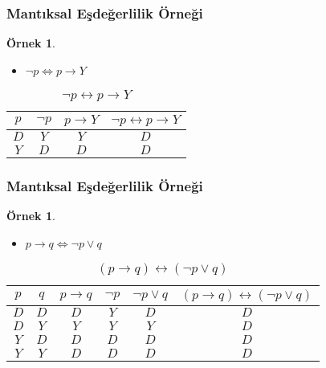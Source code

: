\documentclass[dvipsnames]{beamer}
\theoremstyle{definition}
\theoremstyle{example}
\newtheorem{ornek}[theorem]{Örnek}
\theoremstyle{plain}
\begin{document}
\begin{frame}
  \frametitle{Mantıksal Eşdeğerlilik Örneği}

  \begin{ornek}
    \begin{itemize}
      \item $\neg p \Leftrightarrow p \rightarrow Y$
    \end{itemize}

    \begin{table}
      \caption{$\neg p \leftrightarrow p \rightarrow Y$}
      \begin{tabular}{|c|c|c||c|}\hline
        $p$ & $\neg p$ & $p \rightarrow Y$
            & $\neg p \leftrightarrow p \rightarrow Y$\\\hline\hline
        $D$ & $Y$ & $Y$ & $D$\\\hline
        $Y$ & $D$ & $D$ & $D$\\\hline
      \end{tabular}
    \end{table}
  \end{ornek}
\end{frame}

\begin{frame}
  \frametitle{Mantıksal Eşdeğerlilik Örneği}

  \begin{ornek}
    \begin{itemize}
      \item $p \rightarrow q \Leftrightarrow \neg p \vee q$
    \end{itemize}

    \begin{table}
      \caption{$(p \rightarrow q) \leftrightarrow (\neg p \vee q)$}
      \begin{tabular}{|c|c|c|c|c||c|}\hline
        $p$ & $q$ & $p \rightarrow q$ & $\neg p$ & $\neg p \vee q$
            & $(p \rightarrow q) \leftrightarrow (\neg p \vee q)$\\\hline\hline
        $D$ & $D$ & $D$ & $Y$ & $D$ & $D$\\\hline
        $D$ & $Y$ & $Y$ & $Y$ & $Y$ & $D$\\\hline
        $Y$ & $D$ & $D$ & $D$ & $D$ & $D$\\\hline
        $Y$ & $Y$ & $D$ & $D$ & $D$ & $D$\\\hline
      \end{tabular}
    \end{table}
  \end{ornek}
\end{frame}
\end{document}

